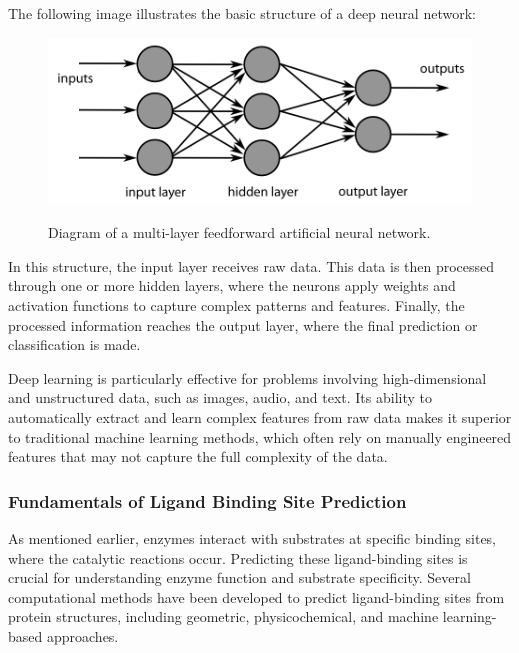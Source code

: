 The following image illustrates the basic structure of a deep neural network:

\begin{figure}[hbt]
    \centering
    \begin{minipage}[t]{.9\textwidth}
    \caption{Diagram of a multi-layer feedforward artificial neural network.}
    \includegraphics[width=1\textwidth]{img/MultiLayer Neural Network Bigger.png}\\
    \label{fig:feedforward_neural_network}
    \end{minipage}
\end{figure}

In this structure, the input layer receives raw data. This data is then processed through one or more hidden layers, where the neurons apply weights and activation functions to capture complex patterns and features. Finally, the processed information reaches the output layer, where the final prediction or classification is made.

Deep learning is particularly effective for problems involving high-dimensional and unstructured data, such as images, audio, and text. Its ability to automatically extract and learn complex features from raw data makes it superior to traditional machine learning methods, which often rely on manually engineered features that may not capture the full complexity of the data.

\subsubsection{Fundamentals of Ligand Binding Site Prediction}
\label{sec:Fundamentals of Ligand Binding Site Prediction}

As mentioned earlier, enzymes interact with substrates at specific binding sites, where the catalytic reactions occur. Predicting these ligand-binding sites is crucial for understanding enzyme function and substrate specificity. Several computational methods have been developed to predict ligand-binding sites from protein structures, including geometric, physicochemical, and machine learning-based approaches.

